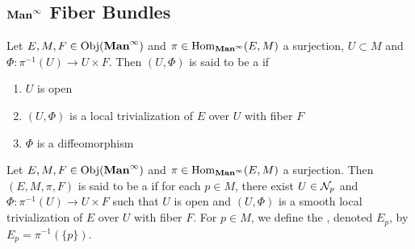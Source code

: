 \documentclass{book}
\begin{document}
	\subsection{$\operatorname*{\text{\textbf{Man}}^{\infty}}$ Fiber Bundles}
	
	\begin{defn} 
		Let $E, M, F \in \operatorname{Obj}(\operatorname*{\text{\textbf{Man}}^{\infty}})$ and $\pi \in \operatorname{Hom}_{\operatorname*{\text{\textbf{Man}}^{\infty}}}(E, M)$ a surjection, $U \subset M$ and $\Phi: \pi^{-1}(U) \rightarrow U \times F$. Then $(U, \Phi)$ is said to be a   if 
		\begin{enumerate}
			\item $U$ is open
			\item $(U, \Phi)$ is a local trivialization of $E$ over $U$ with fiber $F$
			\item $\Phi$ is a diffeomorphism
		\end{enumerate}
	\end{defn}

	\begin{defn} 
		Let $E,M, F \in \operatorname{Obj}(\operatorname*{\text{\textbf{Man}}^{\infty}})$ and $\pi \in \operatorname{Hom}_{\operatorname*{\text{\textbf{Man}}^{\infty}}}(E, M)$ a surjection. Then $(E, M, \pi, F)$ is said to be a  if for each $p \in M$, there exist $U \in \mathcal{N}_p$ and $\Phi: \pi^{-1}(U) \rightarrow U \times F$ such that $U$ is open and $(U, \Phi)$ is a smooth local trivialization of $E$ over $U$ with fiber $F$. For $p \in M$, we define the , denoted $E_p$, by $E_p = \pi^{-1}(\{p\})$.
	\end{defn}
\end{document}
